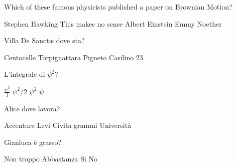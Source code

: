 \documentclass{exam}
\begin{document}
\begin{center}
\end{center}
\vspace{5mm}
\vspace{5mm}
\vspace{5mm}
\begin{questions}
\question[10] Which of these famous physicists published a paper on Brownian Motion?
\begin{choices}
\choice Stephen Hawking 
\choice This makes no sense
\choice Albert Einstein
\choice Emmy Noether
\end{choices}
\question[10] Villa De Sanctis dove sta?
\begin{choices}
\choice Centocelle
\choice Torpignattara
\choice Pigneto
\choice Casilino 23
\end{choices}
\question[10] L'integrale di $\psi^{2}$?
\begin{choices}
\choice $\frac{\psi^{3}}{3}$
\choice $\psi^{2}/2$
\choice $\psi^{2}$
\choice $\psi$
\end{choices}
\question[10] Alice dove lavora?
\begin{choices}
\choice Accenture
\choice Levi Civita
 grammi
\choice Università
\end{choices}
\question[10] Gianluca è grasso?
\begin{choices}
\choice Non troppo
\choice Abbastanza
\choice Si
\choice No
\end{choices}
\end{questions}
           
\end{document}
